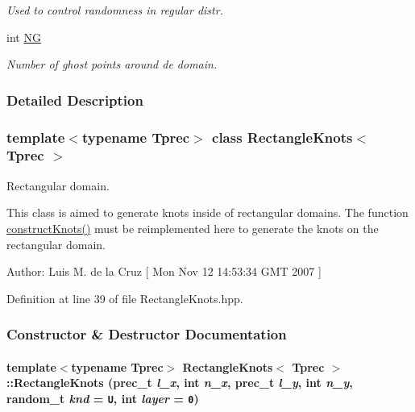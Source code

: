 \begin{CompactItemize}
\begin{CompactList}\small\item\em Used to control randomness in regular distr. \item\end{CompactList}\item 
\hypertarget{classRectangleKnots_6e3941d317ddee6725d52a3f38f7e1df}{
int \hyperlink{classRectangleKnots_6e3941d317ddee6725d52a3f38f7e1df}{NG}}
\label{classRectangleKnots_6e3941d317ddee6725d52a3f38f7e1df}

\begin{CompactList}\small\item\em Number of ghost points around de domain. \item\end{CompactList}\end{CompactItemize}


\subsubsection{Detailed Description}
\subsubsection*{template$<$typename Tprec$>$ class RectangleKnots$<$ Tprec $>$}

Rectangular domain. 

This class is aimed to generate knots inside of rectangular domains. The function \hyperlink{classRectangleKnots_b9906bc5081f67e7f0ce6da2123028bf}{constructKnots()} must be reimplemented here to generate the knots on the rectangular domain. \begin{Desc}
\item[Author:]Luis M. de la Cruz \mbox{[} Mon Nov 12 14:53:34 GMT 2007 \mbox{]} \end{Desc}


Definition at line 39 of file RectangleKnots.hpp.

\subsubsection{Constructor \& Destructor Documentation}
\hypertarget{classRectangleKnots_ed0a328ffda0938f35aa7b1b5fc8952e}{
\paragraph[{RectangleKnots}]{\setlength{\rightskip}{0pt plus 5cm}template$<$typename Tprec$>$ {\bf RectangleKnots}$<$ Tprec $>$::{\bf RectangleKnots} (prec\_\-t {\em l\_\-x}, \/  int {\em n\_\-x}, \/  prec\_\-t {\em l\_\-y}, \/  int {\em n\_\-y}, \/  random\_\-t {\em knd} = {\tt U}, \/  int {\em layer} = {\tt 0})}\hfill}
\label{classRectangleKnots_ed0a328ffda0938f35aa7b1b5fc8952e}


